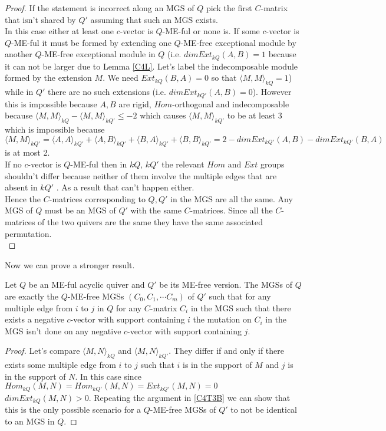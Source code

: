 \begin{proof}
\indent If the statement is incorrect along an MGS of $Q$ pick the first $C$-matrix that isn't shared by $Q'$ assuming that such an MGS exists. \\
\indent In this case either at least one $c$-vector is $Q$-ME-ful or none is. If some $c$-vector is $Q$-ME-ful it must be formed by extending one $Q$-ME-free exceptional module by another $Q$-ME-free exceptional module in $Q$ (i.e. $dim Ext_{kQ}(A,B) = 1$ because it can not be larger due to Lemma \ref{C4L}. Let's label the indecomposable module formed by the extension $M$. We need $Ext_{kQ}(B,A) = 0$ so that $\langle M,M\rangle_{kQ} = 1$) while in $Q'$  there are no such extensions (i.e. $dim Ext_{kQ'}(A,B) = 0$). However this is impossible because $A, B$ are rigid, $Hom$-orthogonal and indecomposable because $\langle M,M\rangle_{kQ} - \langle M,M\rangle_{kQ'} \leq -2$ which causes $\langle M,M\rangle_{kQ'}$ to be at least 3 which is impossible because $\langle M,M\rangle_{kQ'} = \langle A,A\rangle_{kQ'} + \langle A,B\rangle_{kQ'} + \langle B,A\rangle_{kQ'} + \langle B,B\rangle_{kQ'} = 2 - dim Ext_{kQ'}(A,B) - dim Ext_{kQ'}(B,A)$ is at most 2.\\
\indent If no $c$-vector is $Q$-ME-ful then in $kQ$, $kQ'$ the relevant $Hom$ and $Ext$ groups shouldn't differ because neither of them involve the multiple edges that are absent in $kQ'$ . As a result that can't happen either.\\
\indent Hence the $C$-matrices corresponding to $Q, Q'$ in the MGS are all the same. Any MGS of $Q$ must be an MGS of $Q'$ with the same $C$-matrices. Since all the $C$-matrices of the two quivers are the same they have the same associated permutation.\\
\end{proof}
\indent Now we can prove a stronger result.\\
\begin{theorem}\label{C4T3B}
Let $Q$ be an ME-ful acyclic quiver and $Q'$ be its ME-free version. The MGSs of $Q$ are exactly the $Q$-ME-free MGSs $(C_0,C_1,\cdots C_m)$ of $Q'$ such that for any multiple edge from $i$ to $j$ in $Q$ for any $C$-matrix $C_i$ in the MGS such that there exists a negative $c$-vector with support containing $i$ the mutation on $C_i$ in the MGS isn't done on any negative $c$-vector with support containing $j$.
\end{theorem}
\begin{proof}
Let's compare $\langle M, N \rangle_{kQ}$ and $\langle M, N \rangle_{kQ'}$. They differ if and only if there exists some multiple edge from $i$ to $j$ such that $i$ is in the support of $M$ and $j$ is in the support of $N$. In this case since $Hom_{kQ}(M,N) = Hom_{kQ'}(M,N)  = Ext_{kQ'}(M,N) = 0$ $dim Ext_{kQ}(M,N) > 0$. Repeating the argument in \ref{C4T3B} we can show that this is the only possible scenario for a $Q$-ME-free MGSs of $Q'$ to not be identical to an MGS in $Q$.
\end{proof}
